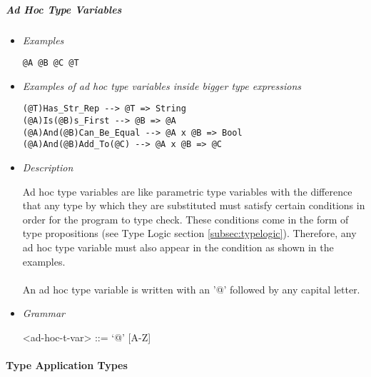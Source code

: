 \documentclass{article}
\begin{document}
\subparagraph{Ad Hoc Type Variables}

\begin{itemize}
\item \textit{Examples}
\begin{verbatim}
@A @B @C @T
\end{verbatim}

\item \textit{Examples of ad hoc type variables inside bigger type expressions}
\begin{verbatim}
(@T)Has_Str_Rep --> @T => String
(@A)Is(@B)s_First --> @B => @A
(@A)And(@B)Can_Be_Equal --> @A x @B => Bool
(@A)And(@B)Add_To(@C) --> @A x @B => @C
\end{verbatim}

\item \textit{Description}

Ad hoc type variables are like parametric type variables with the difference
that any type by which they are substituted must satisfy certain conditions in
order for the program to type check. These conditions come in the form of type
propositions (see Type Logic section \ref{subsec:typelogic}). Therefore, any ad
hoc type variable must also appear in the condition as shown in the examples.
\\\\
An ad hoc type variable is written with an '@' followed by any capital letter.

\item \textit{Grammar}
\begin{grammar}
<ad-hoc-t-var> ::= `@' [A-Z]
\end{grammar}
\end{itemize}

\paragraph{Type Application Types}
\end{document}
